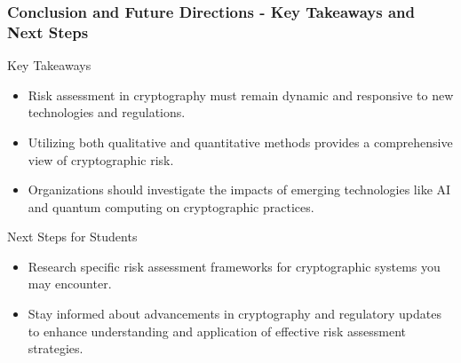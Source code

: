 \documentclass{beamer}
\begin{document}
\begin{frame}[fragile]
    \frametitle{Conclusion and Future Directions - Key Takeaways and Next Steps}
    \begin{block}{Key Takeaways}
        \begin{itemize}
            \item Risk assessment in cryptography must remain dynamic and responsive to new technologies and regulations.
            \item Utilizing both qualitative and quantitative methods provides a comprehensive view of cryptographic risk.
            \item Organizations should investigate the impacts of emerging technologies like AI and quantum computing on cryptographic practices.
        \end{itemize}
    \end{block}

    \begin{block}{Next Steps for Students}
        \begin{itemize}
            \item Research specific risk assessment frameworks for cryptographic systems you may encounter.
            \item Stay informed about advancements in cryptography and regulatory updates to enhance understanding and application of effective risk assessment strategies.
        \end{itemize}
    \end{block}
\end{frame}
\end{document}
